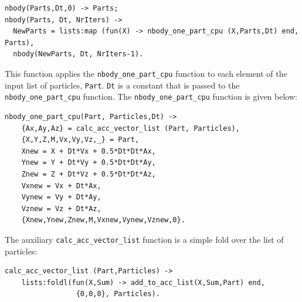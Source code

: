 \documentclass[final]{jfp1}
\makeatletter
\def\thickhrulefill{\leavevmode \leaders \hrule height 0.5pt \hfill \kern \z@}
\newcommand{\hrules}{\vspace{1.5ex}\thickhrulefill}
\newcommand{\hrulee}{\thickhrulefill\vspace{1.5ex}}
\makeatother
\begin{document}
\begin{lstlisting}
nbody(Parts,Dt,0) -> Parts;
nbody(Parts, Dt, NrIters) ->
  NewParts = lists:map (fun(X) -> nbody_one_part_cpu (X,Parts,Dt) end, Parts),
  nbody(NewParts, Dt, NrIters-1).
\end{lstlisting}

\noindent
This function applies the \lstinline{nbody_one_part_cpu} function to each
element of the input list of particles, \lstinline{Part}. \lstinline{Dt}
is a constant that is passed to the \lstinline{nbody_one_part_cpu}
function. The \lstinline{nbody_one_part_cpu} function is given below:

\begin{lstlisting}
nbody_one_part_cpu(Part, Particles,Dt) ->
    {Ax,Ay,Az} = calc_acc_vector_list (Part, Particles),
    {X,Y,Z,M,Vx,Vy,Vz,_} = Part,
    Xnew = X + Dt*Vx + 0.5*Dt*Dt*Ax,
    Ynew = Y + Dt*Vy + 0.5*Dt*Dt*Ay,
    Znew = Z + Dt*Vz + 0.5*Dt*Dt*Az,
    Vxnew = Vx + Dt*Ax,
    Vynew = Vy + Dt*Ay,
    Vznew = Vz + Dt*Az,
    {Xnew,Ynew,Znew,M,Vxnew,Vynew,Vznew,0}.
\end{lstlisting}

\noindent
The auxiliary \lstinline{calc_acc_vector_list} function is a simple fold
over the list of particles: 

\begin{lstlisting}
calc_acc_vector_list (Part,Particles) ->
    lists:foldl(fun(X,Sum) -> add_to_acc_list(X,Sum,Part) end,
                 {0,0,0}, Particles).
\end{lstlisting}
\end{document}
